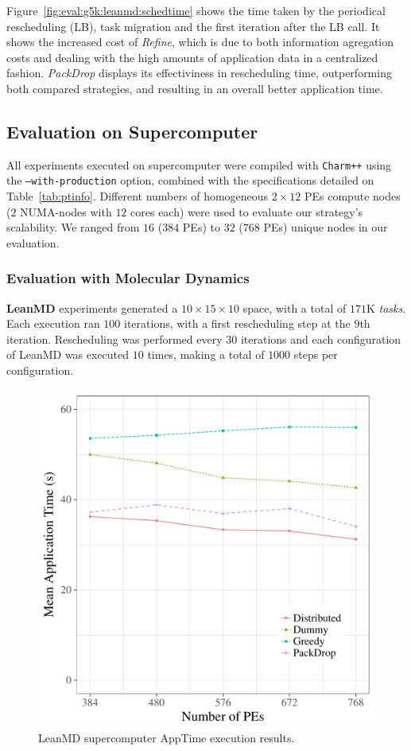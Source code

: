 Figure~\ref{fig:eval:g5k:leanmd:schedtime} shows the time taken by the periodical rescheduling (LB), task migration and the first iteration after the LB call.
It shows the increased cost of \textit{Refine}, which is due to both information agregation costs and dealing with the high amounts of application data in a centralized fashion.
\textit{PackDrop} displays its effectiviness in rescheduling time, outperforming both compared strategies, and resulting in an overall better application time. 

\subsection{Evaluation on Supercomputer} \label{sec:sdumont}

All experiments executed on supercomputer were compiled with \texttt{Charm++} using the \texttt{--with-production} option, combined with the specifications detailed on Table~\ref{tab:ptinfo}.
Different numbers of homogeneous $2\times 12$ PEs compute nodes ($2$ NUMA-nodes with $12$ cores each) were used to evaluate our strategy's scalability.
We ranged from $16$ ($384$ PEs) to $32$ ($768$ PEs) unique nodes in our evaluation. 

\subsubsection{Evaluation with Molecular Dynamics} \label{sec:sdumont:md}

\textbf{LeanMD} experiments generated a $10\times15\times10$ space, with a total of $171$K \textit{tasks}.
Each execution ran $100$ iterations, with a first rescheduling step at the $9$th iteration. 
Rescheduling was performed every $30$ iterations and each configuration of LeanMD was executed $10$ times, making a total of $1000$ steps per configuration. 

\begin{figure}[!ht]
 \centering
 \includegraphics[width=0.9\linewidth]{images/apptime_leanmd_sdumont.pdf}
 \caption{LeanMD supercomputer AppTime execution results.}
 \label{fig:eval:sdumont:leanmd:apptime}
\end{figure}

